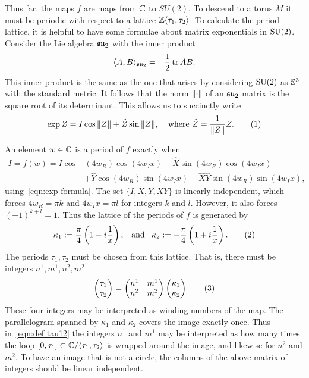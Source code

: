 \documentclass{article}
\begin{document}
Thus far, the maps $f$ are maps from $\C$ to $SU(2)$. To descend to a torus $M$ it must be periodic with respect to a lattice $\Z\langle \tau_1,\tau_2\rangle$. To calculate the period lattice, it is helpful to have some formulae about matrix exponentials in $\SU(2)$. Consider the Lie algebra $\su_2$ with the inner product
\[
\langle A, B \rangle_{\su_2} = -\frac{1}{2}\tr AB.
\]
This inner product is the same as the one that arises by considering $\SU(2)$ as $\S^3$ with the standard metric. It follows that the norm $\norm{\cdot}$ of an $\su_2$ matrix is the square root of its determinant. This allows us to succinctly write 
\[
    \exp Z = I \cos \norm{Z} + \hat{Z} \sin \norm{Z},
    \;\;\;\;
    \text{where }\hat{Z} = \frac{1}{\norm{Z}} Z.
\labelthis{eqn:exp formula}
\]

An element $w\in\C$ is a period of $f$ exactly when
\begin{align*}
I = f(w) = I \cos&(4 w_R)\cos(4 w_I x)
- \hat{X}\sin(4 w_R)\cos(4 w_I x) \\
&+ \hat{Y}\cos(4 w_R)\sin(4 w_I x)
- \hat{X}\hat{Y}\sin(4w_R)\sin(4 w_I x),
\end{align*}
using~\eqref{eqn:exp formula}. The set $\{I,X,Y,XY\}$ is linearly independent, which forces 
$4w_R = \pi k$ and $4 w_I x = \pi l$ for integers $k$ and $l$. However, it also forces $(-1)^{k+l} = 1$.
Thus the lattice of the periods of $f$ is generated by
\[
\kappa_1 := \frac{\pi}{4}\bra{1 - \iu\frac{1}{x}},
\;\;\;\text{and}\;\;\;
\kappa_2 := -\frac{\pi}{4}\bra{1 + \iu\frac{1}{x}}.
\labelthis{eqn:def kappa12}
\]
The periods $\tau_1,\tau_2$ must be chosen from this lattice.
That is, there must be integers $n^1,m^1,n^2,m^2$
\[
\begin{pmatrix}
\tau_1 \\ \tau_2
\end{pmatrix}
= 
\begin{pmatrix}
n^1 & m^1 \\
n^2 & m^2
\end{pmatrix}
\begin{pmatrix}
\kappa_1 \\ \kappa_2
\end{pmatrix}
\labelthis{eqn:def tau12}
\]
These four integers may be interpreted as winding numbers of the map. The parallelogram spanned by $\kappa_1$ and $\kappa_2$ covers the image exactly once. Thus in~\eqref{eqn:def tau12} the integers $n^1$ and $m^1$ may be interpreted as how many times the loop $[0,\tau_1] \subset \C/\langle \tau_1,\tau_2 \rangle$ is wrapped around the image, and likewise for $n^2$ and $m^2$.
To have an image that is not a circle, the columns of the above matrix of integers should be linear independent. 
\end{document}
